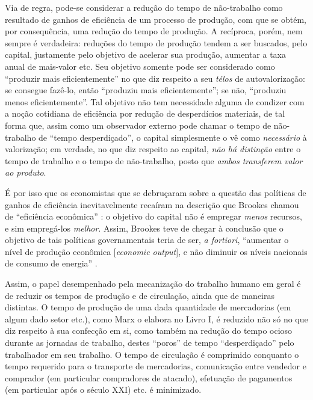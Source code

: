 Via de regra, pode-se considerar a redução do tempo de não-trabalho como resultado de ganhos de eficiência de um processo de produção, com que se obtém, por consequência, uma redução do tempo de produção. A recíproca, porém, nem sempre é verdadeira: reduções do tempo de produção tendem a ser buscados, pelo capital, justamente pelo objetivo de acelerar sua produção, aumentar a taxa anual de mais-valor etc. Seu objetivo somente pode ser considerado como ``produzir mais eficientemente'' no que diz respeito a seu \textit{télos} de autovalorização: se consegue fazê-lo, então ``produziu mais eficientemente''; se não, ``produziu menos eficientemente''. Tal objetivo não tem necessidade alguma de condizer com a noção cotidiana de eficiência por redução de desperdícios materiais, de tal forma que, assim como um observador externo pode chamar o tempo de não-trabalho de ``tempo desperdiçado'', o capital simplesmente o vê como \textit{necessário} à valorização; em verdade, no que diz respeito ao capital, \textit{não há distinção} entre o tempo de trabalho e o tempo de não-trabalho, posto que \textit{ambos transferem valor ao produto}. 

É por isso que os economistas que se debruçaram sobre a questão das políticas de ganhos de eficiência inevitavelmente recaíram na descrição que Brookes chamou de ``eficiência econômica'' \parencite[pp. 355-6]{Brookes2000}: o objetivo do capital não é empregar \textit{menos} recursos, e sim empregá-los \textit{melhor}. Assim, Brookes teve de chegar à conclusão que o objetivo de tais políticas governamentais teria de ser, \textit{a fortiori}, ``aumentar o nível de produção econômica [\textit{economic output}], e não diminuir os níveis nacionais de consumo de energia'' \parencite[p. 363]{Brookes2000}. 



Assim, o papel desempenhado pela mecanização do trabalho humano em geral é de reduzir os tempos de produção e de circulação, ainda que de maneiras distintas. O tempo de produção de uma dada quantidade de mercadorias (em algum dado setor etc.), como Marx o elabora no Livro I, é reduzido não só no que diz respeito à sua confecção em si, como também na redução do tempo ocioso durante as jornadas de trabalho, destes ``poros'' de tempo ``desperdiçado'' pelo trabalhador em seu trabalho. O tempo de circulação é comprimido conquanto o tempo requerido para o transporte de mercadorias, comunicação entre vendedor e comprador (em particular compradores de atacado), efetuação de pagamentos (em particular após o século XXI) etc. é minimizado.



